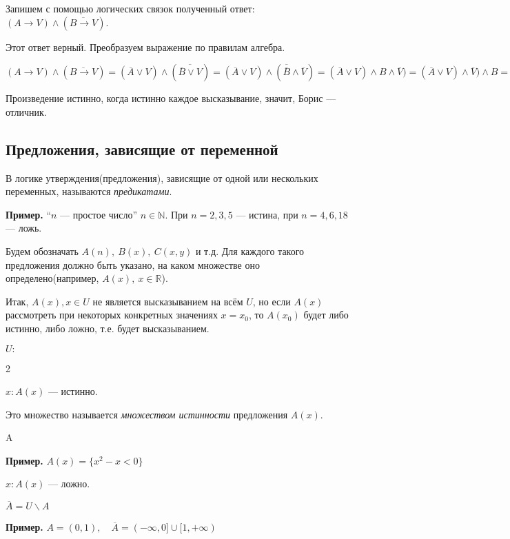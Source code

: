 \documentclass{article}
\begin{document}
    Запишем с помощью логических связок полученный ответ: \((A \rightarrow V) \wedge (\overline{B \rightarrow V})\).

    Этот ответ верный. Преобразуем выражение по правилам алгебра.

    \((A \rightarrow V) \wedge (\overline{B \rightarrow V}) = (\overline{A} \vee V) \wedge (\overline{\overline B \vee V}) = (\overline{A} \vee V) \wedge (\overline{\overline B} \wedge \overline{V}) = (\overline{A} \vee V) \wedge B \wedge \overline{V}) = (\overline{A} \vee V) \wedge \overline{V}) \wedge B = [(\overline{A} \wedge \overline{V}) \vee (V \wedge \overline{V})] \wedge B = [(\overline{A} \wedge \overline{V}) \vee L] \wedge B = \overline{A} \wedge \overline{V} \wedge B\)

    Произведение истинно, когда истинно каждое высказывание, значит, Борис --- отличник.

    \subsection{Предложения, зависящие от переменной}

    В логике утверждения(предложения), зависящие от одной или нескольких переменных, называются \textit{предикатами}.

    \textbf{Пример.} ``\(n\) --- простое число'' \(n \in \mathbb N\). При \(n = 2, 3, 5\) --- истина, при \(n = 4, 6, 18\) --- ложь.

    Будем обозначать \(A(n),\ B(x),\ C(x,y)\) и т.д.
    Для каждого такого предложения должно быть указано, на каком множестве оно определено(например, \(A(x),\ x \in \mathbb{R}\)).
    
    Итак, \(A(x), x \in U\) не является высказыванием на всём \(U\), но если \(A(x)\) рассмотреть при некоторых конкретных значениях \(x = x_0\), то \(A(x_0)\) будет либо истинно, либо ложно, т.е. будет высказыванием.
    
    \begin{center}
        \(U:\)
    \end{center}
    \begin{multicols}{2}
        \begin{center}
            \(x: A(x)\) --- истинно.
        \end{center}
        Это множество называется \textit{множеством истинности} предложения \(A(x)\).
        \begin{center}
            A
        \end{center}
        \textbf{Пример.} \(A(x)=\{x^2-x<0\}\)
        \columnbreak

        \begin{center}
            \(x: A(x)\) --- ложно.
        \end{center}
        \begin{center}
            \(\overline{A} = U\backslash A\)
        \end{center}
        \textbf{Пример.} \(A = (0,1), \quad \overline{A} = (-\infty, 0] \cup [1, +\infty)\)
    \end{multicols}
\end{document}
